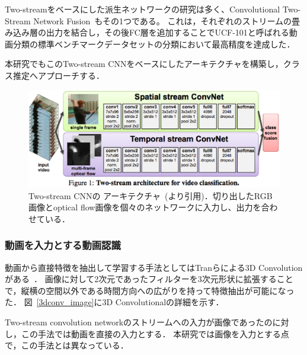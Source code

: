 Two-streamをベースにした派生ネットワークの研究は多く、Convolutional Two-Stream Network Fusion~\cite{a}もその1つである。
これは，それぞれのストリームの畳み込み層の出力を結合し，その後FC層を追加することでUCF-101と呼ばれる動画分類の標準ベンチマークデータセットの分類において最高精度を達成した．

本研究でもこのTwo-stream CNNをベースにしたアーキテクチャを構築し，クラス推定へアプローチする．
\begin{figure}[htbp]
 \begin{center}
  \includegraphics[width=12cm]{./Figures/two-stream.eps}
  \caption{Two-stream CNNの アーキテクチャ~(\cite{simonyan2014two}より引用)．切り出したRGB画像とoptical flow画像を個々のネットワークに入力し、出力を合わせている．}
  \label{2st_network}
 \end{center}
\end{figure}

\subsubsection{動画を入力とする動画認識}
動画から直接特徴を抽出して学習する手法としてはTranらによる3D Convolution がある~\cite{tran14}．
画像に対して2次元であったフィルターを3次元形状に拡張することで，縦横の空間以外である時間方向への広がりを持って特徴抽出が可能になった．
図~\ref{3dconv_image}に3D Convolutionalの詳細を示す．

Two-stream convolution networkのストリームへの入力が画像であったのに対し，この手法では動画を直接の入力とする．
本研究では画像を入力とする点で，この手法とは異なっている．


